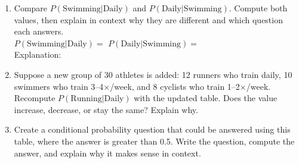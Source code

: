\documentclass[10pt]{article}
\begin{document}
\begin{tcolorbox}[colback=goldbg, colframe=goldacc, boxrule=0.9pt, arc=2mm,
    left=3mm, right=3mm, top=2mm, bottom=2mm,
    title={\bfseries\small Tier E --- Extension: Reverse Conditioning and Missing Values},
    fonttitle=\small]
\small
\begin{enumerate}[leftmargin=1.5em, itemsep=10pt]
  \item Compare $P(\text{Swimming} | \text{Daily})$ and $P(\text{Daily} | \text{Swimming})$.
        Compute both values, then explain in context why they are different and which
        question each answers.\\
        $P(\text{Swimming}|\text{Daily}) = $\blank{4cm} \quad $P(\text{Daily}|\text{Swimming}) = $\blank{4cm}\\
        Explanation: \writeline\writeline\writeline

  \item Suppose a new group of 30 athletes is added: 12 runners who train daily,
        10 swimmers who train 3--4$\times$/week, and 8 cyclists who train 1--2$\times$/week.
        Recompute $P(\text{Running} | \text{Daily})$ with the updated table.
        Does the value increase, decrease, or stay the same? Explain why.\\
        \writeline\writeline\writeline

  \item Create a conditional probability question that could be answered using this table,
        where the answer is greater than 0.5. Write the question, compute the answer,
        and explain why it makes sense in context.\\
        \writeline\writeline\writeline
\end{enumerate}
\end{tcolorbox}
\end{document}

